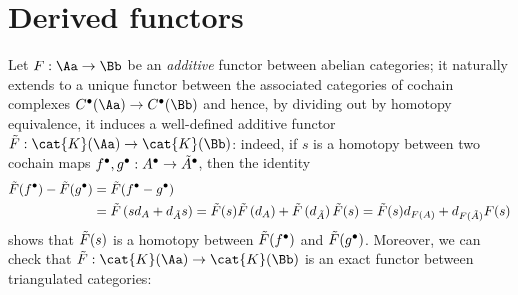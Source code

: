 
\section{Derived functors}

Let $F : \Aa \to \Bb$ be an \emph{additive} functor 
between abelian categories; it naturally extends
to a unique functor between the associated categories of
cochain complexes $C^{\bullet}(\Aa) \to C^{\bullet}(\Bb)$
and hence, by dividing out by homotopy equivalence,
it induces a well-defined additive functor 
$\Tilde{F}:\cat{K}(\Aa) \to \cat{K}(\Bb)$:
indeed, if $s$ is a homotopy between two
cochain maps $f^{\bullet},g^{\bullet}:A^{\bullet} \to \Tilde{A}^{\bullet}$, 
then the identity
\begin{align*}
    \Tilde{F}(f^{\bullet}) - \Tilde{F}(g^{\bullet})
    &= \Tilde{F}(f^{\bullet} - g^{\bullet}) \\
    &= \Tilde{F}\left(sd_{A}+d_{\Tilde{A}}s\right) 
    = \Tilde{F}(s)\Tilde{F}\left(d_{A}\right) + \Tilde{F}\left(d_{\Tilde{A}}\right)\Tilde{F}(s)
    = \Tilde{F}(s)d_{F(A)} + d_{F(\Tilde{A})}F(s)
\end{align*}
shows that $\Tilde{F}(s)$ is a homotopy between
$\Tilde{F}(f^{\bullet})$ and $\Tilde{F}(g^{\bullet})$.
Moreover, we can check that 
$\Tilde{F}:\cat{K}(\Aa) \to \cat{K}(\Bb)$ is an
exact functor between triangulated categories:
